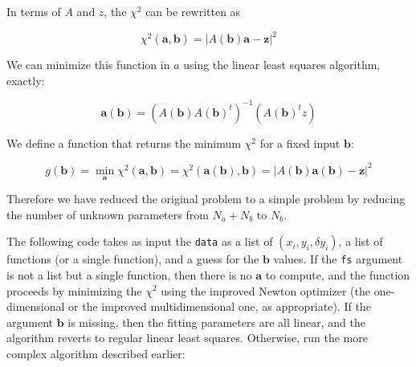 \documentclass[justified, sixbynine]{tufte-book}
\def\ft{\small\tt}
\theoremstyle{plain}%
\newtheorem * {corollary}{Corollary}
\theoremstyle{definition}
\theoremstyle{remark}
\newtheorem * {remark}{Remark}
\newtheorem * {note}{Note}
\begin{document}
\begin{fullwidth}
In terms of $A$ and $z$, the $\chi^2$ can be rewritten as

\begin{equation}
\chi^2(\mathbf{a}, \mathbf{b}) = \left| A(\mathbf{b}) \mathbf{a} - \mathbf{z} \right|^2
\end{equation}

We can minimize this function in $a$ using the linear least squares algorithm, exactly:

\begin{equation}
\mathbf{a}(\mathbf{b}) = (A(\mathbf{b}) A(\mathbf{b})^t)^{-1}(A(\mathbf{b})^t z)
\end{equation}

We define a function that returns the minimum $\chi^2$ for a fixed input $\mathbf{b}$:

\begin{equation}
g(\mathbf{b}) =
\min_{\mathbf{a}}
\chi^2(\mathbf{a}, \mathbf{b}) =
\chi^2(\mathbf{a}(\mathbf{b}), \mathbf{b}) = \left|
A(\mathbf{b})\mathbf{a}(\mathbf{b}) - \mathbf{z}
\right|^2
\end{equation}

Therefore we have reduced the original problem to a simple problem by reducing the number of unknown parameters from $N_a+N_b$ to $N_b$.

The following code takes as input the {\ft data} as a list of $(x_i, y_i, \delta y_i)$, a list of functions (or a single function), and a guess for the $\mathbf{b}$ values. If the {\ft fs} argument is not a list but a single function, then there is no $\mathbf{a}$ to compute, and the function proceeds by minimizing the $\chi^2$ using the improved Newton optimizer (the one-dimensional or the improved multidimensional one, as appropriate). If the argument $\mathbf{b}$ is missing, then the fitting parameters are all linear, and the algorithm reverts to regular linear least squares. Otherwise, run the more complex algorithm described earlier:


\end{fullwidth}
\end{document}

